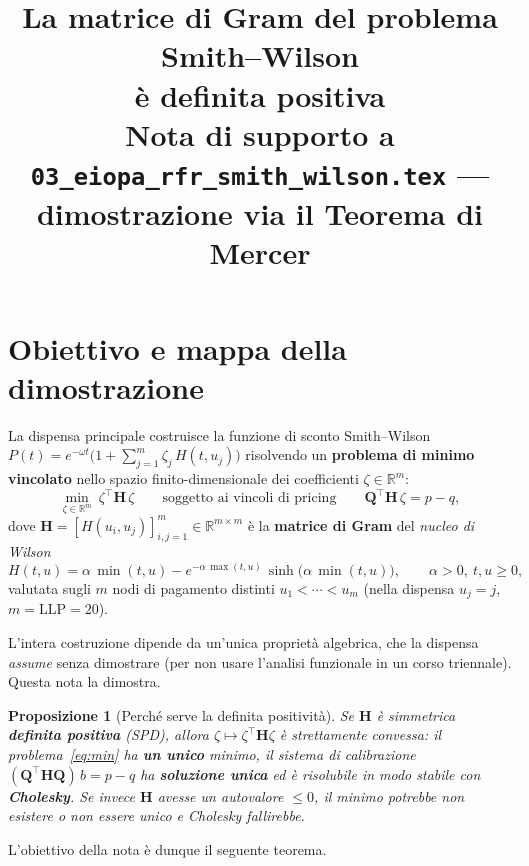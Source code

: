 \documentclass[11pt,a4paper]{article}
\title{\textbf{La matrice di Gram del problema Smith--Wilson\\[2pt]
\`e definita positiva}\\[6pt]
\large Nota di supporto a \texttt{03\_eiopa\_rfr\_smith\_wilson.tex} --- dimostrazione via il
Teorema di Mercer}
\author{}
\date{}
\theoremstyle{plain}
\newtheorem{proposizione}[teorema]{Proposizione}
\theoremstyle{remark}
\newcommand{\Hmat}{\mathbf{H}}
\newcommand{\Qmat}{\mathbf{Q}}
\newcommand{\transp}{^{\!\top}}
\newcommand{\LLP}{\mathrm{LLP}}
\newcommand{\R}{\mathbb{R}}
\begin{document}
\maketitle

\section{Obiettivo e mappa della dimostrazione}
\label{sec:obiettivo}

La dispensa principale costruisce la funzione di sconto Smith--Wilson
$P(t)=e^{-\omega t}\bigl(1+\sum_{j=1}^m \zeta_j\,H(t,u_j)\bigr)$ risolvendo un \textbf{problema
di minimo vincolato} nello spazio finito-dimensionale dei coefficienti $\zeta\in\R^m$:
\begin{equation}
  \min_{\zeta\in\R^m}\ \zeta\transp\Hmat\,\zeta
  \qquad\text{soggetto ai vincoli di pricing}\qquad
  \Qmat\transp\Hmat\,\zeta = p-q,
  \label{eq:min}
\end{equation}
dove $\Hmat=[H(u_i,u_j)]_{i,j=1}^m\in\R^{m\times m}$ \`e la \textbf{matrice di Gram} del
\emph{nucleo di Wilson}
\begin{equation}
  H(t,u) = \alpha\,\min(t,u) - e^{-\alpha\,\max(t,u)}\,\sinh\!\bigl(\alpha\,\min(t,u)\bigr),
  \qquad \alpha>0,\ t,u\ge0,
  \label{eq:H-def}
\end{equation}
valutata sugli $m$ nodi di pagamento distinti $u_1<\cdots<u_m$ (nella dispensa $u_j=j$,
$m=\LLP=20$).

L'intera costruzione dipende da un'unica propriet\`a algebrica, che la dispensa \emph{assume}
senza dimostrare (per non usare l'analisi funzionale in un corso triennale). Questa nota la
dimostra.

\begin{proposizione}[Perch\'e serve la definita positivit\`a]
\label{prop:benposto}
Se $\Hmat$ \`e simmetrica \textbf{definita positiva} (SPD), allora $\zeta\mapsto\zeta\transp\Hmat\zeta$
\`e strettamente convessa: il problema~\eqref{eq:min} ha \textbf{un unico} minimo, il sistema di
calibrazione $(\Qmat\transp\Hmat\Qmat)\,b=p-q$ ha \textbf{soluzione unica} ed \`e risolubile in
modo stabile con \textbf{Cholesky}. Se invece $\Hmat$ avesse un autovalore $\le0$, il minimo
potrebbe non esistere o non essere unico e Cholesky fallirebbe.
\end{proposizione}

L'obiettivo della nota \`e dunque il seguente teorema.
\end{document}
